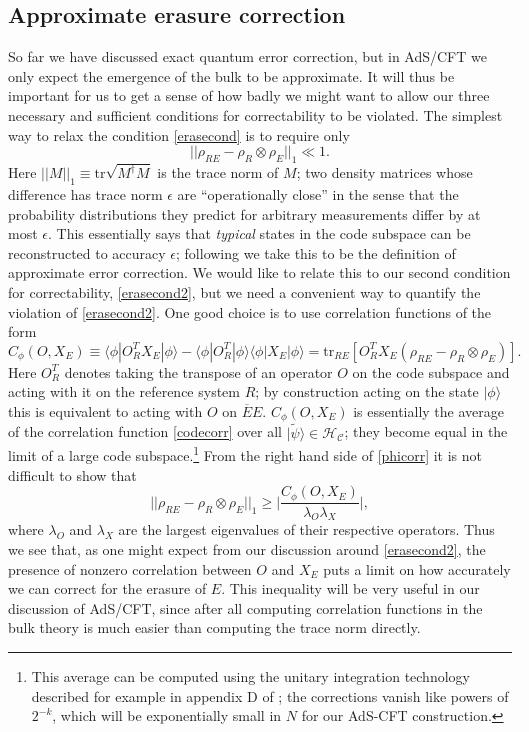 \documentclass[12pt]{article}
\newcommand{\be}{\begin{equation}}
\newcommand{\ee}{\end{equation}}
\newcommand{\tr}{\mathrm{tr}}
\newcommand{\HC}{\mathcal{H}_{\mathcal{C}}}
\newcommand{\lan}{\langle}
\newcommand{\ran}{\rangle}
\newcommand{\wt}{\widetilde}
\newcommand{\ol}{\overline}
\begin{document}
\subsection{Approximate erasure correction}\label{appxsec}
So far we have discussed exact quantum error correction, but in AdS/CFT we only expect the emergence of the bulk to be approximate.  It will thus be important for us to get a sense of how badly we might want to allow our three necessary and sufficient conditions for correctability to be violated.  The simplest way to relax the condition \eqref{erasecond} is to require only \cite{schumacher2002approximate}
\be\label{erasecondappx}
||\rho_{RE}-\rho_R\otimes \rho_E||_1\ll 1.
\ee
Here $||M||_1\equiv\mathrm{tr}\sqrt{M^\dagger M}$ is the trace norm of $M$; two density matrices whose difference has trace norm $\epsilon$ are ``operationally close'' in the sense that the probability distributions they predict for arbitrary measurements differ by at most $\epsilon$.  This essentially says that \textit{typical} states in the code subspace can be reconstructed to accuracy $\epsilon$; following \cite{schumacher2002approximate} we take this to be the definition of approximate error correction.  We would like to relate this to our second condition for correctability, \eqref{erasecond2}, but we need a convenient way to quantify the violation of \eqref{erasecond2}.  One good choice is to use correlation functions of the form
\be\label{phicorr}
C_\phi(O,X_E)\equiv\lan \phi|O^T_R X_E|\phi\ran-\lan\phi|O^T_R|\phi\ran\lan\phi|X_E|\phi\ran=\tr_{RE} \left[O^T_R X_E\left(\rho_{RE}-\rho_R\otimes\rho_E\right)\right].
\ee
Here $O^T_R$ denotes taking the transpose of an operator $O$ on the code subspace and acting with it on the reference system $R$; by construction acting on the state $|\phi\ran$ this is equivalent to acting with $O$ on $\ol{E}E$.  $C_\phi(O,X_E)$ is essentially the average of the correlation function \eqref{codecorr} over all $|\wt{\psi}\ran\in \HC$; they become equal in the limit of a large code subspace.\footnote{This average can be computed using the unitary integration technology described for example in appendix D of \cite{Harlow:2014yka}; the corrections vanish like powers of $2^{-k}$, which will be exponentially small in $N$ for our AdS-CFT construction.}  From the right hand side of \eqref{phicorr} it is not difficult to show that \cite{wolf2008area}
\be\label{cirac}
||\rho_{RE}-\rho_R\otimes \rho_E||_1\geq \Big|\frac{C_\phi(O,X_E)}{\lambda_O\lambda_X}\Big|,
\ee
where $\lambda_O$ and $\lambda_X$ are the largest eigenvalues of their respective operators.  Thus we see that, as one might expect from our discussion around \eqref{erasecond2}, the presence of nonzero correlation between $O$ and $X_E$ puts a limit on how accurately we can correct for the erasure of $E$.  This inequality will be very useful in our discussion of AdS/CFT, since after all computing correlation functions in the bulk theory is much easier than computing the trace norm directly.
\end{document}
